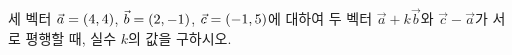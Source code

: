 세 벡터 $\vec{a}=(4{,}\mkern3mu\mathopen{}4)$, $\vec{b}=(2{,}\mkern3mu\mathopen{}-1)$, $\vec{c}=(-1{,}\mkern3mu\mathopen{}5)$에 대하여 두 벡터 $\vec{a}+k\vec{b}$와 $\vec{c}-\vec{a}$가 서로 평행할 때, 실수 $k$의 값을 구하시오.
